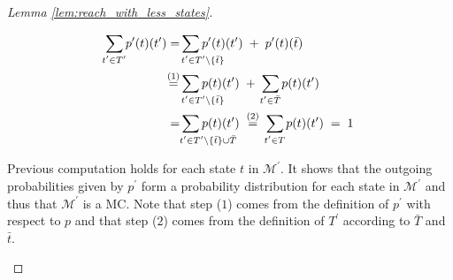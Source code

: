 \documentclass{llncs}
\newcommand{\mc}{\textnormal{MC}}
\newcommand{\ssum}[2]{\sum\limits_{\mathclap{#1}^{#2}}}%
\begin{document}
\begin{proof}[Lemma \ref{lem:reach_with_less_states}]
\begin{enumerate}
	\par\noindent
	\begin{align*}
		\ssum{t^\prime \in T^\prime}{} p^\prime(t)(t^\prime)
		=
		&
		\ssum{\hspace{0.7cm}t^\prime \in T^\prime \setminus \{\bar{t}\}}{} p^\prime(t)(t^\prime)
		\hspace{0.1cm} + \hspace{0.1cm} 
		p^\prime(t)(\bar{t})
\\
		\stackrel{(1)}{=} &
		\ssum{\hspace{0.7cm}t^\prime \in T^\prime \setminus \{\bar{t}\}}{} p(t)(t^\prime)
		\hspace{0.1cm} + \hspace{0.1cm} 
		\ssum{\hspace{0cm}t^\prime \in \bar{T}}{} p(t)(t^\prime)
\\
		= &
		\ssum{\hspace{1cm}t^\prime \in T^\prime \setminus \{\bar{t}\} \cup \bar{T}}{} p(t)(t^\prime)
		\hspace{0.1cm} \stackrel{(2)}{=} \hspace{0.1cm} 	
		\ssum{\hspace{0cm}t^\prime \in T}{} p(t)(t^\prime)
		\hspace{0.1cm} = \hspace{0.1cm} 
		1
	\end{align*}

	Previous computation holds for each state $t$ in $\mathcal{M^\prime}$.
	It shows that the outgoing probabilities given by $p^\prime$ form a probability distribution
	for each state in $\mathcal{M^\prime}$
	and thus that $\mathcal{M^\prime}$ is a {\mc}.
	Note that step ($1$) comes from the definition of $p^\prime$ with respect to $p$ and 
	that step ($2$) comes from the definition of $T^\prime$ according to $\bar{T}$ and $\bar{t}$.
	

\end{enumerate}
\end{proof}
\end{document}
